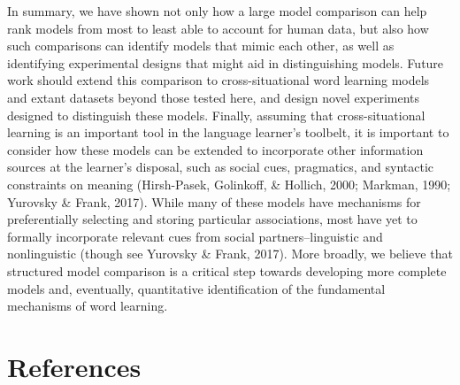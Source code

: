 \documentclass[10pt, letterpaper]{article}
\begin{document}
In summary, we have shown not only how a large model comparison can help
rank models from most to least able to account for human data, but also
how such comparisons can identify models that mimic each other, as well
as identifying experimental designs that might aid in distinguishing
models. Future work should extend this comparison to cross-situational
word learning models and extant datasets beyond those tested here, and
design novel experiments designed to distinguish these models. Finally,
assuming that cross-situational learning is an important tool in the
language learner's toolbelt, it is important to consider how these
models can be extended to incorporate other information sources at the
learner's disposal, such as social cues, pragmatics, and syntactic
constraints on meaning (Hirsh-Pasek, Golinkoff, \& Hollich, 2000;
Markman, 1990; Yurovsky \& Frank, 2017). While many of these models have
mechanisms for preferentially selecting and storing particular
associations, most have yet to formally incorporate relevant cues from
social partners--linguistic and nonlinguistic (though see Yurovsky \&
Frank, 2017). More broadly, we believe that structured model comparison
is a critical step towards developing more complete models and,
eventually, quantitative identification of the fundamental mechanisms of
word learning.

\hypertarget{references}{%
\section{References}\label{references}}
\end{document}
